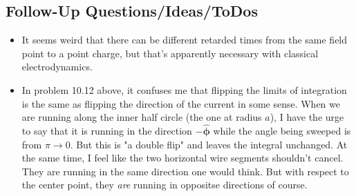 \subsection*{Follow-Up Questions/Ideas/ToDos}
\begin{itemize}
    \item It seems weird that there can be different retarded times from the same field point to a point charge, but that's apparently necessary with classical electrodynamics. 
    \item In problem 10.12 above, it confuses me that flipping the limits of integration is the same as flipping the direction of the current in some sense. When we are running along the inner half circle (the one at radius \(a\)), I have the urge to say that it is running in the direction \(- \boldsymbol{\hat{\mathbf{\phi}}}\) while the angle being sweeped is from \(\pi \to 0\). But this is "a double flip" and leaves the integral unchanged. At the same time, I feel like the two horizontal wire segments shouldn't cancel. They are running in the same direction one would think. But with respect to the center point, they \textit{are} running in oppositse directions of course.  
\end{itemize}
